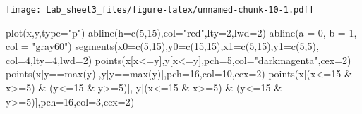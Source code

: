 \documentclass[
]{article}
\newenvironment{Shaded}{\begin{snugshade}}{\end{snugshade}}
\newcommand{\AttributeTok}[1]{\textcolor[rgb]{0.77,0.63,0.00}{#1}}
\newcommand{\DecValTok}[1]{\textcolor[rgb]{0.00,0.00,0.81}{#1}}
\newcommand{\FunctionTok}[1]{\textcolor[rgb]{0.00,0.00,0.00}{#1}}
\newcommand{\NormalTok}[1]{#1}
\newcommand{\SpecialCharTok}[1]{\textcolor[rgb]{0.00,0.00,0.00}{#1}}
\newcommand{\StringTok}[1]{\textcolor[rgb]{0.31,0.60,0.02}{#1}}
\theoremstyle{remark}
\begin{document}
\texttt{[image: Lab\_sheet3\_files/figure-latex/unnamed-chunk-10-1.pdf]}

\begin{Shaded}
\begin{Highlighting}[]
\FunctionTok{plot}\NormalTok{(x,y,}\AttributeTok{type=}\StringTok{"p"}\NormalTok{)}
\FunctionTok{abline}\NormalTok{(}\AttributeTok{h=}\FunctionTok{c}\NormalTok{(}\DecValTok{5}\NormalTok{,}\DecValTok{15}\NormalTok{),}\AttributeTok{col=}\StringTok{"red"}\NormalTok{,}\AttributeTok{lty=}\DecValTok{2}\NormalTok{,}\AttributeTok{lwd=}\DecValTok{2}\NormalTok{)}
\FunctionTok{abline}\NormalTok{(}\AttributeTok{a =} \DecValTok{0}\NormalTok{, }\AttributeTok{b =} \DecValTok{1}\NormalTok{, }\AttributeTok{col =} \StringTok{"gray60"}\NormalTok{)}
\FunctionTok{segments}\NormalTok{(}\AttributeTok{x0=}\FunctionTok{c}\NormalTok{(}\DecValTok{5}\NormalTok{,}\DecValTok{15}\NormalTok{),}\AttributeTok{y0=}\FunctionTok{c}\NormalTok{(}\DecValTok{15}\NormalTok{,}\DecValTok{15}\NormalTok{),}\AttributeTok{x1=}\FunctionTok{c}\NormalTok{(}\DecValTok{5}\NormalTok{,}\DecValTok{15}\NormalTok{),}\AttributeTok{y1=}\FunctionTok{c}\NormalTok{(}\DecValTok{5}\NormalTok{,}\DecValTok{5}\NormalTok{),}
\AttributeTok{col=}\DecValTok{4}\NormalTok{,}\AttributeTok{lty=}\DecValTok{4}\NormalTok{,}\AttributeTok{lwd=}\DecValTok{2}\NormalTok{)}
\FunctionTok{points}\NormalTok{(x[x}\SpecialCharTok{\textless{}=}\NormalTok{y],y[x}\SpecialCharTok{\textless{}=}\NormalTok{y],}\AttributeTok{pch=}\DecValTok{5}\NormalTok{,}\AttributeTok{col=}\StringTok{"darkmagenta"}\NormalTok{,}\AttributeTok{cex=}\DecValTok{2}\NormalTok{)}
\FunctionTok{points}\NormalTok{(x[y}\SpecialCharTok{==}\FunctionTok{max}\NormalTok{(y)],y[y}\SpecialCharTok{==}\FunctionTok{max}\NormalTok{(y)],}\AttributeTok{pch=}\DecValTok{16}\NormalTok{,}\AttributeTok{col=}\DecValTok{10}\NormalTok{,}\AttributeTok{cex=}\DecValTok{2}\NormalTok{)}
\FunctionTok{points}\NormalTok{(x[(x}\SpecialCharTok{\textless{}=}\DecValTok{15} \SpecialCharTok{\&}\NormalTok{ x}\SpecialCharTok{\textgreater{}=}\DecValTok{5}\NormalTok{) }\SpecialCharTok{\&}\NormalTok{ (y}\SpecialCharTok{\textless{}=}\DecValTok{15} \SpecialCharTok{\&}\NormalTok{ y}\SpecialCharTok{\textgreater{}=}\DecValTok{5}\NormalTok{)],}
\NormalTok{y[(x}\SpecialCharTok{\textless{}=}\DecValTok{15} \SpecialCharTok{\&}\NormalTok{ x}\SpecialCharTok{\textgreater{}=}\DecValTok{5}\NormalTok{) }\SpecialCharTok{\&}\NormalTok{ (y}\SpecialCharTok{\textless{}=}\DecValTok{15} \SpecialCharTok{\&}\NormalTok{ y}\SpecialCharTok{\textgreater{}=}\DecValTok{5}\NormalTok{)],}\AttributeTok{pch=}\DecValTok{16}\NormalTok{,}\AttributeTok{col=}\DecValTok{3}\NormalTok{,}\AttributeTok{cex=}\DecValTok{2}\NormalTok{)}

\end{Highlighting}
\end{Shaded}
\end{document}
